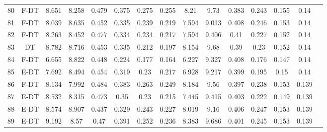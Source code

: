 \begin{longtable}{@{\hskip3pt}c@{\hskip3pt}c@{\hskip3pt}c@{\hskip3pt}c@{\hskip3pt}c@{\hskip3pt}c@{\hskip3pt}c@{\hskip3pt}c@{\hskip3pt}c@{\hskip3pt}c@{\hskip3pt}c@{\hskip3pt}c@{\hskip3pt}c@{\hskip3pt}c@{\hskip3pt}c}
         80 &           F-DT &             8.651 &       8.258 &           0.479 &           0.375 &           0.275 &           0.255 &                8.21 &        9.73 &           0.383 &         0.243 &          0.155 &            0.14 \\
         81 &           F-DT &             8.039 &       8.635 &           0.452 &           0.335 &           0.239 &           0.219 &               7.594 &       9.013 &           0.408 &         0.246 &          0.153 &            0.14 \\
         82 &           F-DT &             8.263 &       8.452 &           0.477 &           0.334 &           0.234 &           0.217 &               7.594 &       9.406 &            0.41 &         0.227 &          0.152 &            0.14 \\
         83 &             DT &             8.782 &       8.716 &           0.453 &           0.335 &           0.212 &           0.197 &               8.154 &        9.68 &            0.39 &          0.23 &          0.152 &            0.14 \\
         84 &           F-DT &             6.655 &       8.822 &           0.448 &           0.224 &           0.177 &           0.164 &               6.227 &       9.327 &           0.408 &         0.176 &          0.147 &            0.14 \\
         85 &           E-DT &             7.692 &       8.494 &           0.454 &           0.319 &            0.23 &           0.217 &               6.928 &       9.217 &           0.399 &         0.195 &           0.15 &            0.14 \\
         86 &           F-DT &             8.134 &       7.992 &           0.484 &           0.383 &           0.263 &           0.249 &               8.184 &        9.56 &           0.397 &         0.238 &          0.153 &           0.139 \\
         87 &           E-DT &             8.532 &       8.315 &           0.473 &            0.35 &            0.23 &           0.215 &               7.445 &       9.415 &           0.403 &         0.222 &          0.149 &           0.139 \\
         88 &           E-DT &             8.574 &       8.907 &           0.437 &           0.329 &           0.243 &           0.227 &               8.019 &        9.16 &           0.406 &         0.247 &          0.153 &           0.139 \\
         89 &           E-DT &             9.192 &        8.57 &            0.47 &           0.391 &           0.252 &           0.236 &               8.383 &       9.686 &           0.401 &         0.245 &          0.153 &           0.139 \\

\end{longtable}

